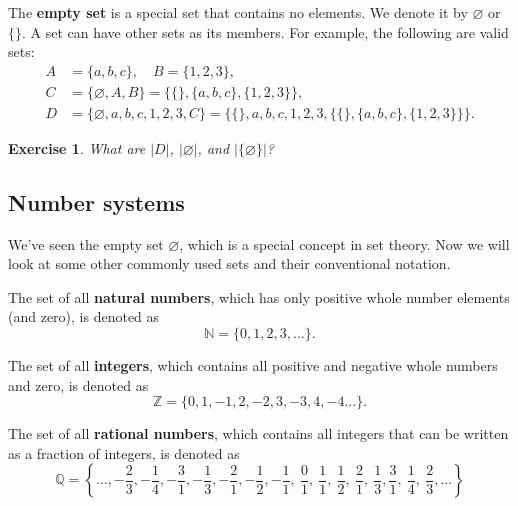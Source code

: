 \documentclass{article}[12pt]
\newtheorem{exercise}{Exercise}
\newcommand{\N}{\mathbb{N}}
\newcommand{\Z}{\mathbb{Z}}
\newcommand{\Q}{\mathbb{Q}}
\begin{document}
        The \textbf{empty set} is a special set that contains no elements. We denote it by $\varnothing$ or $\{\}$. A set can have other sets as its members. For example, the following are valid sets:
        \begin{align}
            A &= \{a, b, c\}, \quad B = \{1, 2, 3\},
            \\
            C &= \{\varnothing, A, B\} = \{\{\}, \{a, b, c\}, \{1, 2, 3\}\},
            \\
            D &= \{\varnothing, a, b, c, 1, 2, 3, C\}
            = \{\{\}, a, b, c, 1, 2, 3, \{\{\}, \{a, b, c\}, \{1, 2, 3\}\}\}.
        \end{align}
        
        \begin{exercise}
            What are $|D|$, $|\varnothing|$, and $|\{\varnothing\}|$?
        \end{exercise}
    
    \subsection{Number systems}
        
        We've seen the empty set $\varnothing$, which is a special concept in set theory. Now we will look at some other commonly used sets and their conventional notation.
        
        The set of all \textbf{natural numbers}, which has only positive whole number elements (and zero), is denoted as
        \begin{equation}
            \N = \{0, 1, 2, 3, ...\}.
        \end{equation}
    
        The set of all \textbf{integers}, which contains all positive and negative whole numbers and zero, is denoted as
        \begin{equation}
            \Z = \{0, 1, -1, 2, -2, 3, -3, 4, -4...\}.
        \end{equation}
        
        The set of all \textbf{rational numbers}, which contains all integers that can be written as a fraction of integers, is denoted as
        \begin{equation}
            \Q
            = \left\{...,
            -\frac{2}{3}, -\frac{1}{4}, -\frac{3}{1}, -\frac{1}{3}, -\frac{2}{1}, -\frac{1}{2}, -\frac{1}{1},\ 
            \frac{0}{1},\
            \frac{1}{1},\ \frac{1}{2},\ \frac{2}{1},\ \frac{1}{3}, \frac{3}{1},\ \frac{1}{4},\ \frac{2}{3},
            ...\right\}
        \end{equation}
        
\end{document}
